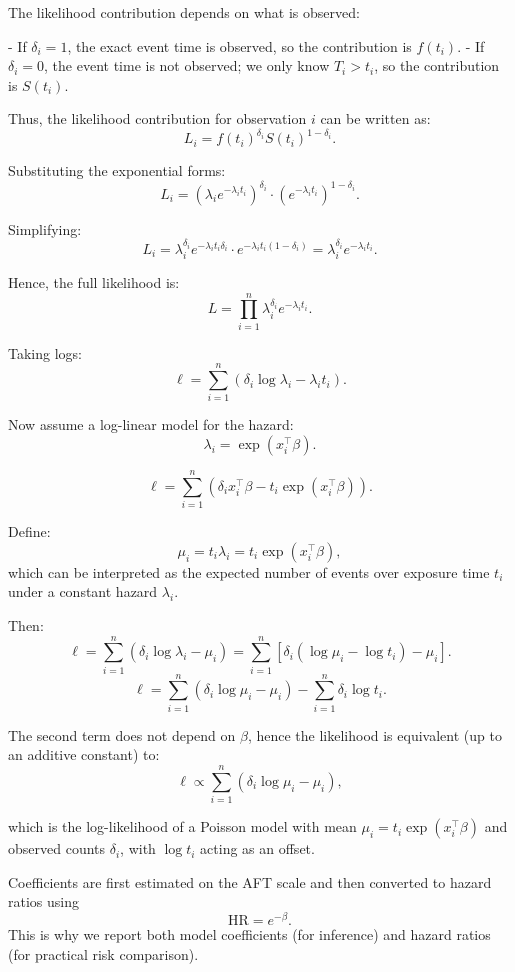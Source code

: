 \documentclass[10pt,a4paper]{article}
\begin{document}
The likelihood contribution depends on what is observed:

- If $\delta_i = 1$, the exact event time is observed, so the contribution is $f(t_i)$.
- If $\delta_i = 0$, the event time is not observed; we only know $T_i > t_i$, so the contribution is $S(t_i)$.

Thus, the likelihood contribution for observation $i$ can be written as:
\[
L_i = f(t_i)^{\delta_i} S(t_i)^{1-\delta_i}.
\]

Substituting the exponential forms:
\[
L_i = \left(\lambda_i e^{-\lambda_i t_i}\right)^{\delta_i} \cdot \left(e^{-\lambda_i t_i}\right)^{1-\delta_i}.
\]

Simplifying:
\[
L_i = \lambda_i^{\delta_i} e^{-\lambda_i t_i \delta_i} \cdot e^{-\lambda_i t_i (1-\delta_i)}
= \lambda_i^{\delta_i} e^{-\lambda_i t_i}.
\]

Hence, the full likelihood is:
\[
L = \prod_{i=1}^n \lambda_i^{\delta_i} e^{-\lambda_i t_i}.
\]

Taking logs:
\[
\ell = \sum_{i=1}^n \left( \delta_i \log \lambda_i - \lambda_i t_i \right).
\]

Now assume a log-linear model for the hazard:
\[
\lambda_i = \exp(x_i^\top \beta).
\]

\[
\ell = \sum_{i=1}^n \left( \delta_i x_i^\top \beta - t_i \exp(x_i^\top \beta) \right).
\]

Define:
\[
\mu_i = t_i \lambda_i = t_i \exp(x_i^\top \beta),
\]
which can be interpreted as the expected number of events over exposure time $t_i$ under a constant hazard $\lambda_i$.

Then:
\[
\ell = \sum_{i=1}^n \left( \delta_i \log \lambda_i - \mu_i \right)
= \sum_{i=1}^n \left[ \delta_i (\log \mu_i - \log t_i) - \mu_i \right].
\]
\[
\ell = \sum_{i=1}^n \left( \delta_i \log \mu_i - \mu_i \right) - \sum_{i=1}^n \delta_i \log t_i.
\]

The second term does not depend on $\beta$, hence the likelihood is equivalent (up to an additive constant) to:
\[
\ell \propto \sum_{i=1}^n \left( \delta_i \log \mu_i - \mu_i \right),
\]

which is the log-likelihood of a Poisson model with mean $\mu_i = t_i \exp(x_i^\top \beta)$ and observed counts $\delta_i$, with $\log t_i$ acting as an offset.


Coefficients are first estimated on the AFT scale and then converted to hazard ratios using
\[
\mathrm{HR}=e^{-\beta}.
\]
This is why we report both model coefficients (for inference) and hazard ratios (for practical risk comparison).
\end{document}
